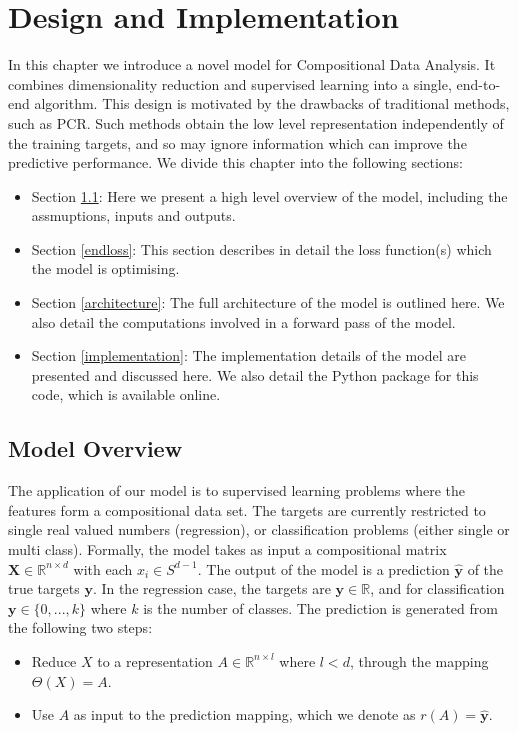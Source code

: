 \chapter{Design and Implementation}
\label{cha:design}
In this chapter we introduce a novel model for Compositional Data Analysis. It combines dimensionality reduction and supervised learning into a single, end-to-end algorithm. This design is motivated by the drawbacks of traditional methods, such as PCR. Such methods obtain the low level representation independently of the training targets, and so may ignore information which can improve the predictive performance. We divide this chapter into the following sections: 

\begin{itemize}
    \item Section \ref{design}: Here we present a high level overview of the model, including the assmuptions, inputs and outputs. 
    \item Section  \ref{endloss}: This section describes in detail the loss function(s) which the model is optimising.
    \item Section \ref{architecture}: The full architecture of the model is outlined here. We also detail the computations involved in a forward pass of the model. 
    \item Section \ref{implementation}: The implementation details of the model are presented and discussed here. We also detail the Python package for this code, which is available online.
\end{itemize}
\pagebreak



\section{Model Overview}
\label{design}
The application of our model is to supervised learning problems where the features form a compositional data set. The targets are currently restricted to single real valued numbers (regression), or classification problems (either single or multi class). Formally, the model takes as input a compositional matrix $\mathbf{X} \in \mathbb{R}^{n \times d}$ with each $x_i \in S^{d-1}$.  The output of the model is a prediction $\hat{\mathbf{y}}$ of the true targets $\mathbf{y}$. In the regression case, the targets are $\mathbf{y} \in \mathbb{R}$, and for classification $\mathbf{y} \in \{0, ..., k\}$ where $k$ is the number of classes. The prediction is generated from the following two steps:
\begin{itemize}
    \item Reduce $X$ to a representation $A \in \mathbb{R}^{n \times l}$ where $l < d$, through the mapping $\Theta(X) = A$.
    \item Use $A$ as input to the prediction mapping, which we denote as $r(A) = \mathbf{\hat{y}}$.
\end{itemize}

